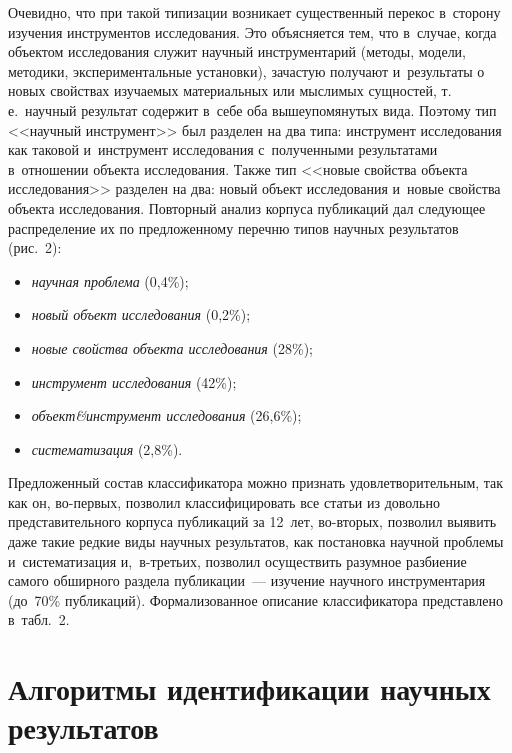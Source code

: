 \begin{multicols}{2}
    Очевидно, что при такой типизации возникает существенный перекос 
в~сторону изучения инструментов исследования. Это объясняется тем, что 
в~случае, когда объектом исследования служит научный инструментарий 
(методы, модели, методики, экспериментальные установки), зачастую 
получают и~результаты о новых свойствах изучаемых материальных или 
мыслимых сущностей, т.\,е.\ научный результат содержит в~себе оба 
вышеупомянутых вида. Поэтому тип <<научный инструмент>> был разделен 
на два типа: инструмент исследования как таковой и~инструмент 
исследования с~полученными результатами в~отношении объекта 
исследования. Также тип <<новые свойства объекта исследования>> 
разделен на два: новый объект исследования и~новые свойства объекта 
исследования. Повторный анализ корпуса публикаций дал следующее 
распределение их по предложенному перечню типов научных результатов 
(рис.~2):
    \begin{itemize}
\item \textit{научная проблема} (0,4\%);
\item \textit{новый объект исследования} (0,2\%);
\item \textit{новые свойства объекта исследования} (28\%);
\item \textit{инструмент исследования} (42\%);
\item \textit{объект\&инструмент исследования} (26,6\%);
\item \textit{систематизация} (2,8\%).
\end{itemize}



    Предложенный состав классификатора можно признать 
удовлетворительным, так как он, во-пер\-вых, позволил классифицировать 
все статьи из довольно представительного корпуса публикаций за 12~лет, 
 во-вто\-рых, позволил выявить даже такие редкие виды научных 
результатов, как постановка научной проблемы и~систематизация  
и,~в-треть\-их, позволил осуществить разумное разбиение самого обширного 
раздела публикации~--- изучение научного инструментария (до~70\% 
публикаций). Формализованное описание классификатора пред\-став\-ле\-но 
в~табл.~2.
    


\section{Алгоритмы идентификации научных результатов}


\end{multicols}
